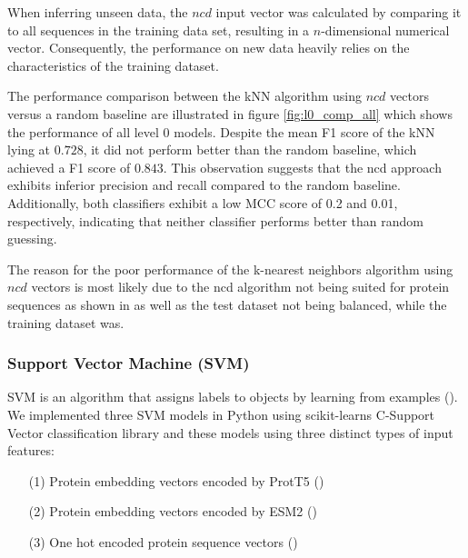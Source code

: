 \documentclass{bioinfo}
\begin{document}
When inferring unseen data, the $ncd$ input vector was calculated by comparing it to all sequences in 
the training data set, resulting in a $n$-dimensional numerical vector.
Consequently, the performance on new data heavily relies on the characteristics of the training dataset.

The performance comparison between the kNN algorithm using $ncd$ vectors versus a random baseline are illustrated in figure \ref{fig:l0_comp_all}
which shows the performance of all level 0 models.
Despite the mean F1 score of the kNN lying at $0.728$, it did not perform better than the random baseline, which 
achieved a F1 score of $0.843$.
This observation suggests that the ncd approach exhibits inferior precision and recall compared to the random baseline. 
Additionally, both classifiers exhibit a low MCC score of 0.2 and 0.01, respectively, indicating that neither classifier performs better than random guessing.



The reason for the poor performance of the k-nearest neighbors algorithm using $ncd$ vectors is
most likely due to the ncd algorithm not being suited for protein sequences as shown in \cite{GzipProteinCompression} as well as
the test dataset not being balanced, while the training dataset was.

\subsubsection{Support Vector Machine (SVM)}
SVM is an algorithm that assigns labels to objects by learning from examples (\cite{svm}).
We implemented three SVM models in Python using scikit-learns C-Support Vector classification library and these models using three distinct types of 
input features: 
\begin{enumerate}
	\item[(1)] Protein embedding vectors encoded by ProtT5 (\cite{ProtT5})
	\item[(2)] Protein embedding vectors encoded by ESM2 (\cite{ESM2})
	\item[(3)] One hot encoded protein sequence vectors (\cite{oh_encoding})
\end{enumerate}
\end{document}
